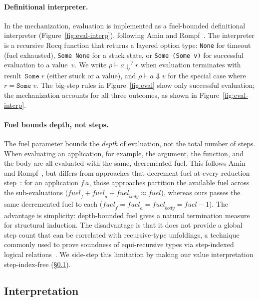 \documentclass[acmsmall]{acmart}
\begin{document}
\paragraph{Definitional interpreter.}



In the mechanization, evaluation is implemented as a fuel-bounded definitional interpreter (Figure~\ref{fig:eval-interp}), following Amin and Rompf~\cite{amin2017}. The interpreter is a recursive Rocq function that returns a layered option type: \lstinline{None} for timeout (fuel exhausted), \lstinline{Some None} for a stuck state, or \lstinline{Some (Some v)} for successful evaluation to a value~$v$. We write $\rho \vdash a \Downarrow^? r$ when evaluation terminates with result~$\texttt{Some}\; r$ (either stuck or a value), and $\rho \vdash a \Downarrow v$ for the special case where $r = \texttt{Some}\; v$. The big-step rules in Figure~\ref{fig:eval} show only successful evaluation; the mechanization accounts for all three outcomes, as shown in Figure~\ref{fig:eval-interp}.

\paragraph{Fuel bounds depth, not steps.}\label{para:fuel}
The fuel parameter bounds the \emph{depth} of evaluation, not the total number of steps. When evaluating an application, for example, the argument, the function, and the body are all evaluated with the same, decremented fuel. This follows Amin and Rompf~\cite{amin2017}, but differs from approaches that decrement fuel at every reduction step~\cite{owens2016, paraskevopoulou2021}: for an application $f\,a$, those approaches partition the available fuel across the sub-evaluations ($\textit{fuel}_f + \textit{fuel}_a + \textit{fuel}_{body} \approx \textit{fuel}$), whereas ours passes the same decremented fuel to each ($\textit{fuel}_f = \textit{fuel}_a = \textit{fuel}_{body} = \textit{fuel} - 1$). The advantage is simplicity: depth-bounded fuel gives a natural termination measure for structural induction. The disadvantage is that it does not provide a global step count that can be correlated with recursive-type unfoldings, a technique commonly used to prove soundness of equi-recursive types via step-indexed logical relations~\cite{timany2024}. We side-step this limitation by making our value interpretation step-index-free (\S\ref{sec:interpretation}).

\subsection{Interpretation}\label{sec:interpretation}
\end{document}

